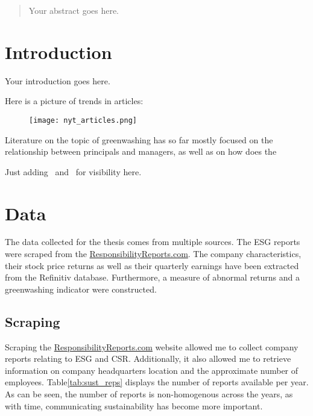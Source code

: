 \documentclass[12pt]{article}
\author{Your Name}
\date{Date of submission: \today}
\begin{document}

\pagebreak

\begin{abstract}
Your abstract goes here.


\end{abstract}
\pagebreak

\tableofcontents
\pagebreak

\section{Introduction}\label{sect:introduction}
Your introduction goes here.

Here is a picture of trends in articles: 

\begin{figure}[!h]
    \texttt{[image: nyt\_articles.png]}
\end{figure}

Literature on the topic of greenwashing has so far mostly focused on the relationship between principals and managers, as well as on how does the 


Just adding~\parencite{lagasio_esg-washing_2024} and~\parencite{wu_bad_2020} for visibility here.
\parencite{bingler_cheap_2022}
\parencite{bingler_how_2024}
\parencite{gourier_greenwashing_2024}
\parencite{ilhan_climate_2023}

\newpage

\section{Data}\label{sect:data}

The data collected for the thesis comes from multiple sources. The ESG reports were scraped from the \href{https://responsibilityreports.com}{ResponsibilityReports.com}. The company characteristics, their stock price returns as well as their quarterly earnings have been extracted from the Refinitiv database. Furthermore, a measure of abnormal returns and a greenwashing indicator were constructed.


\subsection{Scraping}

Scraping the \href{https://responsibilityreports.com}{ResponsibilityReports.com} website allowed me to collect company reports relating to ESG and CSR\@. Additionally, it also allowed me to retrieve information on company headquarters location and the approximate number of employees. Table\ref{tab:sust_reps} displays the number of reports available per year. As can be seen, the number of reports is non-homogenous across the years, as with time, communicating sustainability has become more important. 
    
\end{document}
